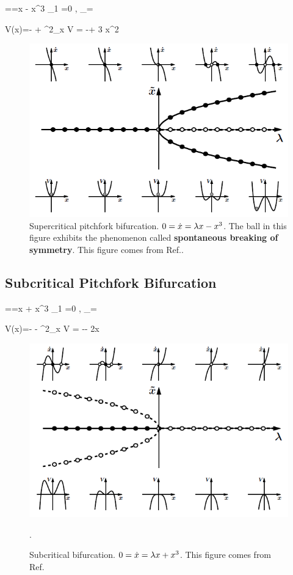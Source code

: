 ==\lam x  - x^3
\implies {}_1 =0
\;,\;\;
_\pm = \pm \sqrt{\lam}
\eeq

\beq
V(x)=-\lam {} 
+ 
\implies \partial^2_x V = -\lam + 3 x^2
\eeq

\begin{figure}[h!]
 \centering
 \includegraphics[width=5in]
 {dynamical-sys/bifur-super.png}
 \caption{Supercritical pitchfork bifurcation. 
 $0=\dot{x}=\lambda x  - x^3$.
 The ball in this 
 figure exhibits
 the phenomenon called 
 {\bf spontaneous breaking of symmetry}. This
 figure  comes from Ref.\cite{dynamical-fuchs}.}
 \label{fig-bifur-super}
\end{figure}
 
\subsection{Subcritical
Pitchfork Bifurcation}

==\lam x  + x^3
\implies {}_1 =0
\;,\;\;
_\pm = \pm \sqrt{-\lam}
\eeq

\beq
V(x)=-\lam {} 
- 
\implies \partial^2_x V = -\lam - 2x
\eeq

\begin{figure}[h!]
 \centering
 \includegraphics[width=5in]
 {dynamical-sys/bifur-sub.png}
 \caption{Subcritical  bifurcation. $0=\dot{x}=\lambda x  + x^3$.  This
 figure  comes from Ref.\cite{dynamical-fuchs}}.
 \label{fig-bifur-sub}
 \end{figure}

